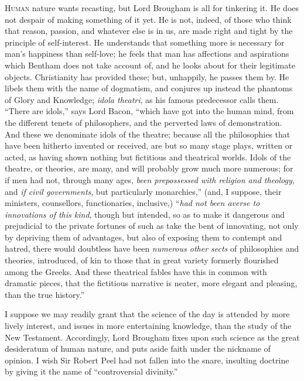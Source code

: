 H\textsc{uman} nature wants recasting, but Lord Brougham is all for
tinkering it. He does not despair of making something of it yet. He is
not, indeed, of those who think that reason, passion, and whatever
else is in us, are made right and tight by the principle of
self-interest. He understands that something more is necessary for man's
happiness than self-love; he feels that man has affections and
aspirations which Bentham does not take account of, and he looks about
for their legitimate objects. Christianity has provided these; but,
unhappily, he passes them by. He libels them with the name of
dogmatism, and conjures up instead the phantoms of Glory and
Knowledge; \emph{idola theatri}, as his famous predecessor calls them.
``There are idols,'' says Lord Bacon, ``which have got
into the human mind, from the different tenets of philosophers, and
the perverted laws of demonstration. And these we denominate idols of
the theatre; because all the philosophies that have been hitherto
invented or received, are but so many stage plays, written or acted,
as having shown nothing but fictitious and theatrical worlds. Idols of
the theatre, or theories, are many, and will probably grow much more
numerous; for if men had not, through many ages, \emph{been prepossessed
with religion and theology}, and \emph{if civil governments},
but particularly monarchies,'' (and, I suppose, their ministers,
counsellors, functionaries, inclusive,) ``\emph{had not been averse
to innovations of this kind}, though but intended, so as to make it
dangerous and prejudicial to the private fortunes of such as take the
bent of innovating, not only by depriving them of advantages, but also
of exposing them to contempt and hatred, there would doubtless have
been \emph{numerous other sects} of philosophies and theories,
introduced, of kin to those that in great variety formerly flourished
among the Greeks. And these theatrical fables have this in common with
dramatic pieces, that the fictitious narrative is neater, more elegant
and pleasing, than the true history.''

I suppose we may readily grant that the science of the day is
attended by more lively interest, and issues in more entertaining
knowledge, than the study of the New Testament. Accordingly, Lord
Brougham fixes upon such science as the great desideratum of human
nature, and puts aside faith under the nickname of opinion. I wish Sir
Robert Peel had not fallen into the snare, insulting doctrine by
giving it the name of ``controversial divinity.''

